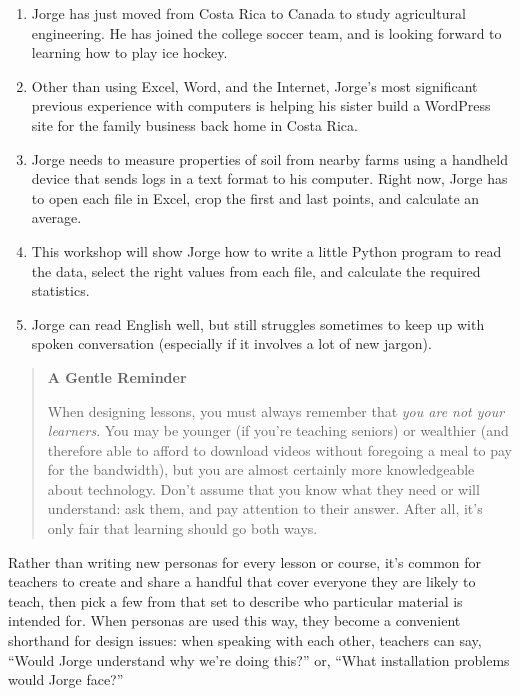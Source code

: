 \begin{enumerate}
\item
  Jorge has just moved from Costa Rica to Canada to study
  agricultural engineering. He has joined the college soccer team,
  and is looking forward to learning how to play ice hockey.
\item
  Other than using Excel, Word, and the Internet, Jorge's most
  significant previous experience with computers is helping his
  sister build a WordPress site for the family business back home in
  Costa Rica.
\item
  Jorge needs to measure properties of soil from nearby farms using a
  handheld device that sends logs in a text format to his computer.
  Right now, Jorge has to open each file in Excel, crop the first and
  last points, and calculate an average.
\item
  This workshop will show Jorge how to write a little Python program
  to read the data, select the right values from each file, and
  calculate the required statistics.
\item
  Jorge can read English well, but still struggles sometimes to keep
  up with spoken conversation (especially if it involves a lot of new
  jargon).
\end{enumerate}

\begin{quote}\setlength{\parindent}{0pt}
\textbf{A Gentle Reminder}

When designing lessons, you must always remember that \emph{you are not
your learners}. You may be younger (if you're teaching seniors) or
wealthier (and therefore able to afford to download videos without
foregoing a meal to pay for the bandwidth), but you are almost
certainly more knowledgeable about technology. Don't assume that you
know what they need or will understand: ask them, and pay attention
to their answer. After all, it's only fair that learning should go
both ways.
\end{quote}

Rather than writing new personas for every lesson or course, it's
common for teachers to create and share a handful that cover everyone
they are likely to teach, then pick a few from that set to describe
who particular material is intended for. When personas are used this
way, they become a convenient shorthand for design issues: when
speaking with each other, teachers can say, ``Would Jorge understand
why we're doing this?'' or, ``What installation problems would Jorge
face?''

